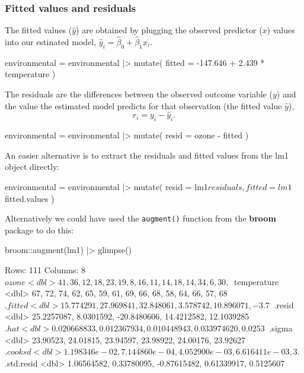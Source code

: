 \documentclass[a4paper]{article}\usepackage[]{graphicx}\usepackage[]{xcolor}
\begin{document}
\subsubsection{Fitted values and residuals}
The fitted values (\( \hat{y} \)) are obtained by plugging the observed predictor (\( x \)) values into our estinated model, \( \hat{y}_i =\hat{\beta}_0 + \hat{\beta}_1 x_i \).
\begin{Schunk}
\begin{Sinput}
environmental = environmental |> 
  mutate(
    fitted = -147.646 + 2.439 * temperature
  )
\end{Sinput}
\end{Schunk}
The residuals are the differences between the observed outcome variable (\( y \)) and the value the estimated model predicts for that observation (the fitted value \( \hat{y} \)),
\[
	r_i = y_i - \hat{y}_i.
\]
\begin{Schunk}
\begin{Sinput}
environmental = environmental |> 
  mutate(
    resid = ozone - fitted
    )
\end{Sinput}
\end{Schunk}
An easier alternative is to extract the residuals and fitted values from the lm1 object directly:
\begin{Schunk}
\begin{Sinput}
environmental = environmental |> 
  mutate(
    resid = lm1$residuals,
    fitted = lm1$fitted.values
  )
\end{Sinput}
\end{Schunk}
Alternatively we could have used the \lstinline|augment()| function from the \textbf{broom} package to do this:
\begin{Schunk}
\begin{Sinput}
broom::augment(lm1) |> glimpse()
\end{Sinput}
\begin{Soutput}
Rows: 111
Columns: 8
$ ozone       <dbl> 41, 36, 12, 18, 23, 19, 8, 16, 11, 14, 18, 14, 34, 6, 30, ~
$ temperature <dbl> 67, 72, 74, 62, 65, 59, 61, 69, 66, 68, 58, 64, 66, 57, 68~
$ .fitted     <dbl> 15.774291, 27.969841, 32.848061, 3.578742, 10.896071, -3.7~
$ .resid      <dbl> 25.2257087, 8.0301592, -20.8480606, 14.4212582, 12.1039285~
$ .hat        <dbl> 0.020668833, 0.012367934, 0.010448943, 0.033974620, 0.0253~
$ .sigma      <dbl> 23.90523, 24.01815, 23.94597, 23.98922, 24.00176, 23.92627~
$ .cooksd     <dbl> 1.198346e-02, 7.144860e-04, 4.052900e-03, 6.616411e-03, 3.~
$ .std.resid  <dbl> 1.06564582, 0.33780095, -0.87615482, 0.61339917, 0.5125607~
\end{Soutput}
\end{Schunk}
\end{document}
